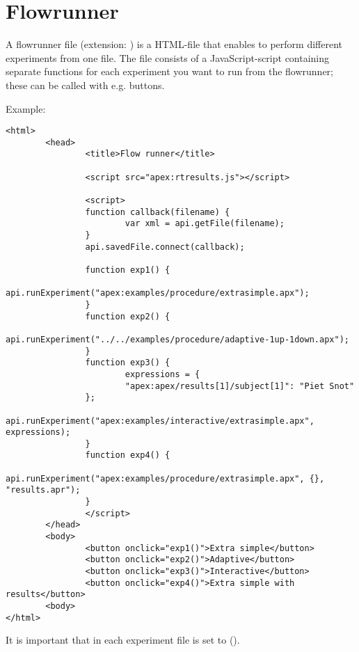 \chapter{Flowrunner}
\label{sec:flowrunner}

A flowrunner file (extension: ) is a HTML-file that enables to perform different \apex experiments from one file. The file consists of a JavaScript-script containing separate functions for each \apex experiment you want to run from the flowrunner; these can be called with e.g. buttons.

Example:
\begin{lstlisting}
<html>
        <head>
                <title>Flow runner</title>

                <script src="apex:rtresults.js"></script>

                <script>
                function callback(filename) {
                        var xml = api.getFile(filename);
                }
                api.savedFile.connect(callback);

                function exp1() {
                        api.runExperiment("apex:examples/procedure/extrasimple.apx");
                }
                function exp2() {
                        api.runExperiment("../../examples/procedure/adaptive-1up-1down.apx");
                }
                function exp3() {
                        expressions = {
                        "apex:apex/results[1]/subject[1]": "Piet Snot"
                };
                        api.runExperiment("apex:examples/interactive/extrasimple.apx", expressions);
                }
                function exp4() {
                        api.runExperiment("apex:examples/procedure/extrasimple.apx", {}, "results.apr");
                }
                </script>
        </head>
        <body>
                <button onclick="exp1()">Extra simple</button>
                <button onclick="exp2()">Adaptive</button>
                <button onclick="exp3()">Interactive</button>
                <button onclick="exp4()">Extra simple with results</button>
        <body>
</html>
\end{lstlisting}

It is important that in each experiment file  is set to  ().
